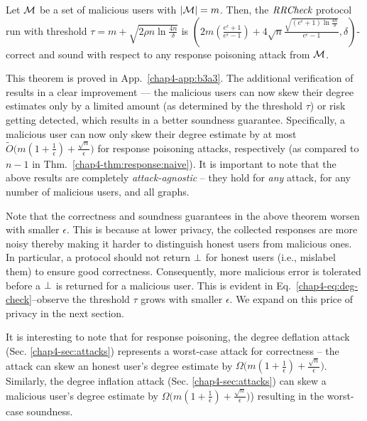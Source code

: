 \begin{thm}\label{chap4-thm:response:check}
Let $\mathcal{M}$ be a set of malicious users with $|\mathcal{M}| = m$. Then,
the  $\textit{RRCheck}$ protocol run with threshold $\tau = m + \sqrt{2\rho n \ln \tfrac{4n}{\delta}}$ is
  $\left( 2m (\frac{e^\epsilon+1}{e^{\epsilon}-1}) + 4\sqrt{n}\frac{ \sqrt{(e^\epsilon+1)\ln \frac{4n}{\delta}}}{e^\epsilon-1}, \delta\right)$-correct and sound with respect to any
response poisoning attack from $\mathcal{M}$.
\end{thm}
This theorem is proved in App.~\ref{chap4-app:b3a3}. The additional verification of \DegRRCheck{} results in a clear improvement --- the malicious users can now skew their degree estimates only by a limited amount (as determined by the threshold $\tau$)  or risk getting detected,  which results in a better soundness guarantee. Specifically, a malicious user can now only skew their degree estimate by at most $ \tilde{O}\big(m(1+\frac{1}{\epsilon}) + \frac{\sqrt{n}}{{\epsilon}}\big)$ for response poisoning attacks, respectively (as compared to $n-1$ in Thm.~\ref{chap4-thm:response:naive}). 
It is important to note that the above results are completely \textit{attack-agnostic} -- they hold for \textit{any} attack, for any number of malicious users, and all graphs.

Note that the correctness and soundness guarantees in the above theorem worsen with smaller $\epsilon$. This is because at lower privacy, the collected responses are more noisy thereby making it harder to distinguish honest users from malicious ones. In particular, a protocol should not return $\perp$ for honest users (i.e., mislabel them) to ensure good correctness. Consequently, more malicious error is tolerated before a $\perp$ is returned for a malicious user. This is evident in Eq.~\ref{chap4-eq:deg-check}--observe the threshold $\tau$ grows with smaller $\epsilon$. We expand on this price of privacy in the next section. 

It is interesting to note that for response poisoning, the degree deflation attack (Sec. \ref{chap4-sec:attacks}) represents a worst-case attack for correctness -- the attack can skew an honest user's degree estimate by $\Omega\big(m(1+\frac{1}{\epsilon})+\frac{\sqrt{n}}{\epsilon}\big)$.  Similarly, the degree inflation attack (Sec. \ref{chap4-sec:attacks}) can skew a malicious user's degree estimate by $\Omega\big(m(1+\frac{1}{\epsilon})+\frac{\sqrt{n}}{\epsilon}\big)$) resulting in the worst-case soundness. %


